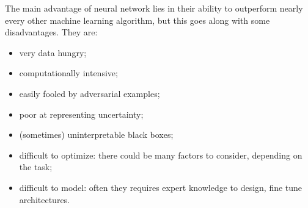The main advantage of neural network lies in their ability to outperform nearly every other machine learning algorithm, but this goes along with some disadvantages. They are:

\begin{itemize}
 \item very data hungry;
 \item computationally intensive;
 \item easily fooled by adversarial examples;
 \item poor at representing uncertainty;
 \item (sometimes) uninterpretable black boxes;
 \item difficult to optimize: there could be many factors to consider, depending on the task;
 \item difficult to model: often they requires expert knowledge to design, fine tune architectures.
\end{itemize}
